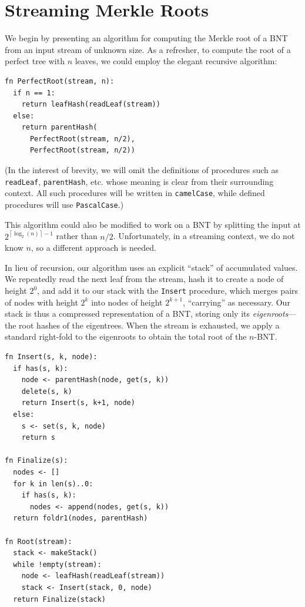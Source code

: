 \documentclass[twocolumn]{article}
\begin{document}
\section{Streaming Merkle Roots}

We begin by presenting an algorithm for computing the Merkle root of a BNT from an input stream of unknown size. As a refresher, to compute the root of a perfect tree with $n$ leaves, we could employ the elegant recursive algorithm:

\begin{minipage}[c]{0.95\textwidth}
\begin{lstlisting}
fn PerfectRoot(stream, n):
  if n == 1:
    return leafHash(readLeaf(stream))
  else:
    return parentHash(
      PerfectRoot(stream, n/2),
      PerfectRoot(stream, n/2))
\end{lstlisting}
\end{minipage}

(In the interest of brevity, we will omit the definitions of procedures such as \verb`readLeaf`, \verb`parentHash`, etc. whose meaning is clear from their surrounding context. All such procedures will be written in \verb`camelCase`, while defined procedures will use \verb`PascalCase`.)

This algorithm could also be modified to work on a BNT by splitting the input at $2^{\left \lceil{\log_2(n)}\right \rceil - 1}$ rather than $n/2$. Unfortunately, in a streaming context, we do not know $n$, so a different approach is needed.

In lieu of recursion, our algorithm uses an explicit ``stack'' of accumulated values. We repeatedly read the next leaf from the stream, hash it to create a node of height $2^0$, and add it to our stack with the \verb`Insert` procedure, which merges pairs of nodes with height $2^k$ into nodes of height $2^{k+1}$, ``carrying'' as necessary. Our stack is thus a compressed representation of a BNT, storing only its \textit{eigenroots}---the root hashes of the eigentrees. When the stream is exhausted, we apply a standard right-fold to the eigenroots to obtain the total root of the $n$-BNT.

\begin{minipage}[c]{0.95\textwidth}
\begin{lstlisting}
fn Insert(s, k, node):
  if has(s, k):
    node <- parentHash(node, get(s, k))
    delete(s, k)
    return Insert(s, k+1, node)
  else:
    s <- set(s, k, node)
    return s
    
fn Finalize(s):
  nodes <- []
  for k in len(s)..0:
    if has(s, k):
      nodes <- append(nodes, get(s, k))
  return foldr1(nodes, parentHash)

fn Root(stream):
  stack <- makeStack()
  while !empty(stream):
    node <- leafHash(readLeaf(stream))
    stack <- Insert(stack, 0, node)
  return Finalize(stack)
\end{lstlisting}
\end{minipage}
\end{document}
